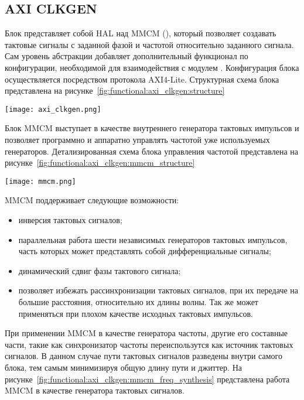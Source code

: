 \subsection{AXI CLKGEN}
\label{sec:functional:axi_clkgen}

Блок  представляет собой HAL над MMCM (),
который позволяет создавать тактовые сигналы с заданной фазой и частотой относительно заданного
сигнала. Сам уровень абстракции добавляет дополнительный функционал по конфигурации, необходимой
для взаимодействия с модулем . Конфигурация блока осуществляется посредством
протокола AXI4-Lite. Структурная схема блока представлена на рисунке~\ref{fig:functional:axi_clkgen:structure}

\begin{center}
  \centering
  \texttt{[image: axi\_clkgen.png]}
  \label{fig:functional:axi_clkgen:structure}
\end{center}

Блок MMCM выступает в качестве внутреннего генератора тактовых импульсов и позволяет
программно и аппаратно управлять частотой уже используемых генераторов. Детализированная схема
блока управления частотой представлена на рисунке~\ref{fig:functional:axi_clkgen:mmcm_structure}

\begin{center}
  \centering
  \texttt{[image: mmcm.png]}
  \label{fig:functional:axi_clkgen:mmcm_structure}
\end{center}


MMCM поддерживает следующие возможности:
\begin{itemize}
  \item инверсия тактовых сигналов;
  \item параллельная работа шести независимых генераторов тактовых импульсов, часть которых
    может представлять собой дифференциальные сигналы;
  \item динамический сдвиг фазы тактового сигнала;
  \item позволяет избежать рассинхронизации тактовых сигналов, при их передаче на большие
    расстояния, относительно их длины волны. Так же может применяться при плохом качестве
    исходных тактовых импульсов.
\end{itemize}

При применении MMCM в качестве генератора частоты, другие его составные части, такие как
синхронизатор частоты переиспользутся как источник тактовых сигналов. В данном случае
пути тактовых сигналов разведены внутри самого блока, тем самым минимизируя общую длину пути
и джиттер. На рисунке~\ref{fig:functional:axi_clkgen:mmcm_freq_synthesis} представлена
работа MMCM в качестве генератора тактовых сигналов.

